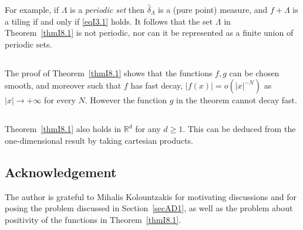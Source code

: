 \documentclass[reqno,a4paper,12pt]{amsart}
\numberwithin{equation}{section}
\numberwithin{figure}{section}
\newcommand\R{\mathbb{R}}
\newcommand\Lam{\Lambda}
\newcommand\1{\mathds{1}}
\renewcommand\geq{\geqslant}
\renewcommand\hat{\widehat}
\theoremstyle{plain}
\newcommand{\thmref}[1]{Theorem~\ref{#1}}
\newcommand{\secref}[1]{Section~\ref{#1}}
\theoremstyle{definition}
\begin{document}
For example, if $\Lambda$ is a \emph{periodic set}
then $\hat\delta_\Lambda$ is a (pure point) measure,
and $f + \Lam$ is a tiling if and only if
\eqref{eqI3.1} holds. It follows that the set $\Lam$
in \thmref{thmI8.1} is not periodic, nor can it
be represented as a finite union of periodic  sets.



\subsection{}
The proof of \thmref{thmI8.1} shows that the
functions $f,g$ can be chosen smooth, and 
moreover such
that $f$ has fast decay, $|f(x)| = o(|x|^{-N})$
as $|x| \to +\infty$ for every $N$. However
the function $g$  in the theorem cannot decay fast.


\subsection{}
\thmref{thmI8.1} also holds in $\R^d$ for any $d\geq 1$.
This can be deduced from the one-dimensional result
by taking cartesian products.


\subsection*{Acknowledgement}
The author is grateful to Mihalis Kolountzakis
for motivating discussions and for
posing the problem discussed in
\secref{secAD1}, as well as the problem 
 about positivity
of the functions in \thmref{thmI8.1}.



\end{document}
